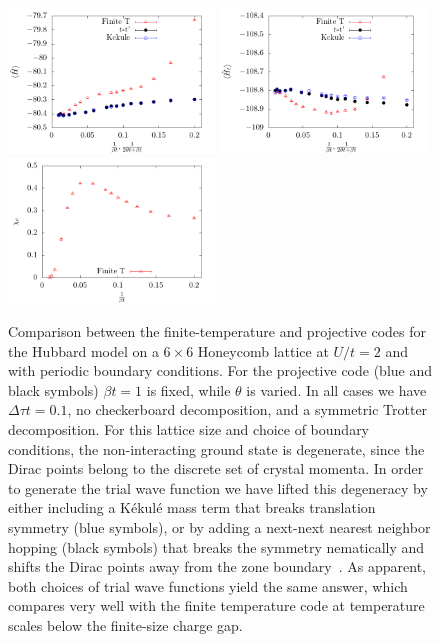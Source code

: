 \begin{figure}
\center
\includegraphics[width=0.49\textwidth]{Figures/Projector/Proj_ener-2.pdf}
\includegraphics[width=0.49\textwidth]{Figures/Projector/Proj_kin-2.pdf} \\
\includegraphics[width=0.49\textwidth]{Figures/Projector/Proj_chi-2.pdf}

	\caption{Comparison between the finite-temperature and projective codes for the Hubbard model on a $6 \times 6 $  Honeycomb lattice at $U/t=2$ and with periodic boundary conditions.   For the projective code (blue and black symbols) $\beta t = 1$ is fixed, while $\theta$ is varied. In all cases we have $\Delta \tau t = 0.1$, no checkerboard decomposition, and a symmetric Trotter decomposition.  For this lattice size and choice of boundary conditions, the non-interacting ground state is degenerate, since the Dirac points belong to the discrete set of crystal momenta.  In order to generate the trial wave function we  have lifted this degeneracy by either including a K\'ekul\'e mass term \cite{Lang13} that breaks translation symmetry (blue symbols), or by adding a next-next nearest neighbor hopping (black symbols) that breaks the symmetry nematically and shifts the Dirac points away from the zone boundary~\cite{Ixert14}. As apparent, both choices of trial wave functions yield the same answer, which compares very well with the finite temperature code at temperature scales below the finite-size charge gap.}
	\label{PQMC.fig}
\end{figure}

